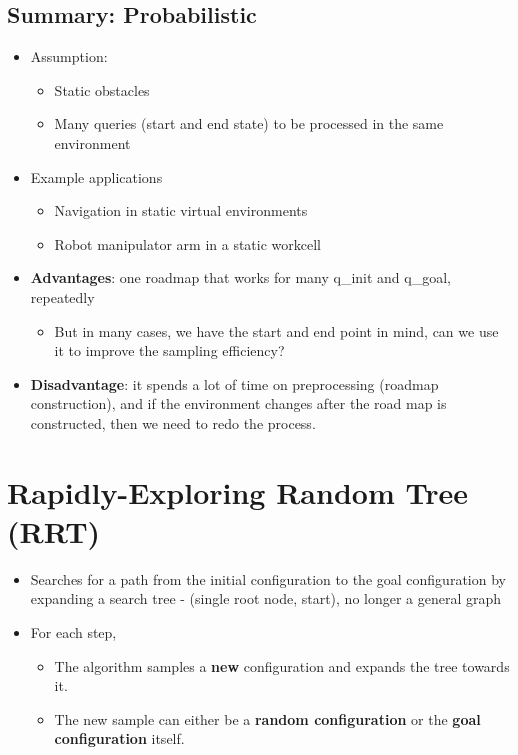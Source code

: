 \documentclass[10pt]{article}
\begin{document}
\subsection*{Summary: Probabilistic}
\begin{itemize}
	\item Assumption:
	\begin{itemize}
        \item Static obstacles
        \item Many queries (start and end state) to be processed in the same environment
    \end{itemize}
	\item Example applications
	\begin{itemize}
        \item Navigation in static virtual environments
        \item Robot manipulator arm in a static workcell
    \end{itemize}
	\item \textbf{Advantages}: one roadmap that works for many q\_init and q\_goal, repeatedly
	\begin{itemize}
        \item But in many cases, we have the start and end point in mind, can we use it to improve the sampling efficiency?
    \end{itemize}
	\item \textbf{Disadvantage}: it spends a lot of time on preprocessing (roadmap construction), and if the environment changes after the road map is constructed, then we need to redo the process.
\end{itemize}

\section*{Rapidly-Exploring Random Tree (RRT)}
\begin{itemize}
	\item Searches for a path from the initial configuration to the goal configuration by expanding a search tree - (single root node, start), no longer a general graph
	\item For each step,
	\begin{itemize}
        \item The algorithm samples a \textbf{new} configuration and expands the tree towards it.
        \item The new sample can either be a \textbf{random configuration} or the \textbf{goal configuration} itself.
    \end{itemize}
\end{itemize}
\end{document}
